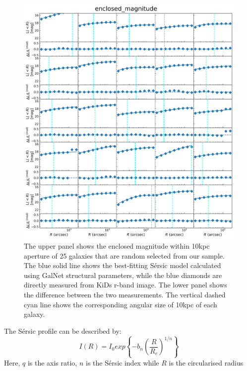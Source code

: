 \documentclass[fleqn,usenatbib]{mnras}
\begin{document}
\begin{figure}
    \centering
    \includegraphics[width=0.8\linewidth]{figure/enclosed_mag.png}
    \caption{The upper panel shows the enclosed magnitude within 10kpc aperture of 25 galaxies that are random selected from our sample. The blue solid line shows the best-fitting S\'{e}rsic model calculated using GalNet structural parameters, while the blue diamonds are directly measured from KiDs r-band image. The lower panel shows the difference between the two measurements. The vertical dashed cyan line shows the corresponding angular size of 10kpc of each galaxy.} 
    \label{fig:enclosed_magnitude}
\end{figure}
\par The S\'{e}rsic profile can be described by:
\begin{equation}
    I(R) = I_0 exp\left\{-b_n\left(\frac{R}{R_e}\right)^{1/n}\right\}
    \label{SB}
\end{equation}
Here, $q$ is the axis ratio, $n$ is the S\'{e}rsic index while $R$ is the circularised radius
\end{document}

